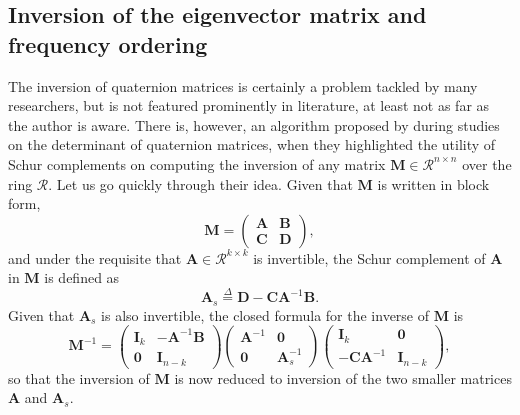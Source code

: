 \subsection{Inversion of the eigenvector matrix and frequency ordering}
\label{subsec:inversion}
The inversion of quaternion matrices is certainly a problem tackled by many researchers, but is not featured prominently in literature, at least not as far as the author is aware. There is, however, an algorithm proposed by \parencite{cohen1999quaternionic} during studies on the determinant of quaternion matrices, when they highlighted the utility of Schur complements on computing the inversion of any matrix $\mathbf{M} \in \mathcal{R}^{n \times n}$ over the ring $\mathcal{R}$. Let us go quickly through their idea. Given that $\mathbf{M}$ is written in block form,
\begin{equation}
    \label{eq:block}
    \mathbf{M} = \begin{pmatrix}
        \mathbf{A} & \mathbf{B} \\
        \mathbf{C} & \mathbf{D}
    \end{pmatrix},
\end{equation}
and under the requisite that $\mathbf{A} \in \mathcal{R}^{k \times k}$ is invertible, the Schur complement of $\mathbf{A}$ in $\mathbf{M}$ is defined as
\begin{equation}
    \mathbf{A}_s \overset{\Delta}{=} \mathbf{D}
    - \mathbf{C}\mathbf{A}^{-1} \mathbf{B}.
\end{equation}
Given that $\mathbf{A}_s$ is also invertible, the closed formula for the inverse of $\mathbf{M}$ is
\begin{equation}
    \label{eq:schur}
    \mathbf{M}^{-1} =
    \begin{pmatrix}
        \mathbf{I}_k & - \mathbf{A}^{-1} \mathbf{B} \\
        \mathbf{0}   & \mathbf{I}_{n - k}
    \end{pmatrix}
    \begin{pmatrix}
        \mathbf{A}^{-1} & \mathbf{0}        \\
        \mathbf{0}      & \mathbf{A}_s^{-1}
    \end{pmatrix}
    \begin{pmatrix}
        \mathbf{I}_k                 & \mathbf{0}         \\
        - \mathbf{C} \mathbf{A}^{-1} & \mathbf{I}_{n - k}
    \end{pmatrix},
\end{equation}
so that the inversion of $\mathbf{M}$ is now reduced to inversion of the two smaller matrices $\mathbf{A}$ and $\mathbf{A}_s$.

